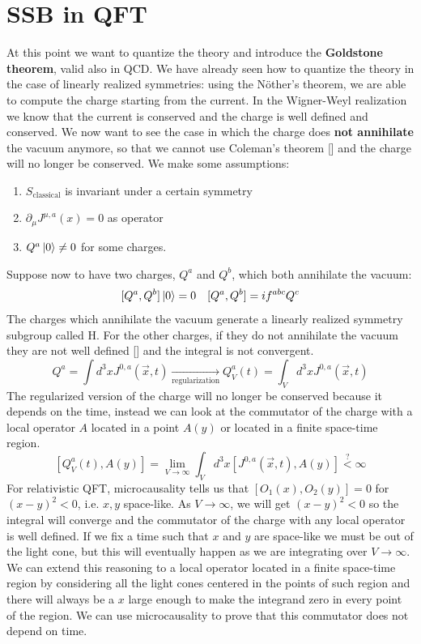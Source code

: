\documentclass[../main.tex]{subfiles}
\begin{document}
\section{SSB in QFT}
At this point we want to quantize the theory and introduce the \textbf{Goldstone theorem}, valid also in QCD. We have already seen how to quantize the theory in the case of linearly realized symmetries: using the N\"other's theorem, we are able to compute the charge starting from the current. In the Wigner-Weyl realization we know that the current is conserved and the charge is well defined and conserved. We now want to see the case in which the charge does \textbf{not annihilate} the vacuum anymore, so that we cannot use Coleman's theorem [] and the charge will no longer be conserved. We make some assumptions:
\begin{enumerate}
    \item $S_{\text{classical}}$ is invariant under a certain symmetry
    \item $\partial_\mu J^{\mu,a}(x)=0$ as operator
    \item $Q^a\ket{0}\neq0$ for some charges.
\end{enumerate}
Suppose now to have two charges, $Q^a$ and $Q^b$, which both annihilate the vacuum:
\[
[Q^a,Q^b]\ket{0}=0 \quad [Q^a,Q^b]=if^{abc}Q^c
\]
The charges which annihilate the vacuum generate a linearly realized symmetry subgroup called H. For the other charges, if they do not annihilate the vacuum they are not well defined [] and the integral is not convergent.
\[
Q^a=\int d^3xJ^{0,a}(\Vec{x},t)\xrightarrow[\text{regularization}]{}Q^a_V(t)=\int_V d^3xJ^{0,a}(\Vec{x},t)
\]
The regularized version of the charge will no longer be conserved because it depends on the time, instead we can look at the commutator of the charge with a local operator $A$ located in a point $A(y)$ or located in a finite space-time region.
\[
[Q_V^a(t),A(y)]=\lim_{V\to\infty}\int_Vd^3x[J^{0,a}(\Vec{x},t),A(y)]\stackrel{?}{<}\infty
\]
For relativistic QFT, microcausality tells us that $[O_1(x),O_2(y)]=0$ for $(x-y)^2<0$, i.e. $x,y$ space-like. As $V\to\infty$, we will get $(x-y)^2<0$ so the integral will converge and the commutator of the charge with any local operator is well defined. If we fix a time such that $x$ and $y$ are space-like we must be out of the light cone, but this will eventually happen as we are integrating over $V\to\infty$. We can extend this reasoning to a local operator located in a finite space-time region by considering all the light cones centered in the points of such region and there will always be a $x$ large enough to make the integrand zero in every point of the region. We can use microcausality to prove that this commutator does not depend on time.
\end{document}
